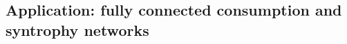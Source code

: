 \documentclass[12pt, titlepage]{report}
\begin{document}
%

\subsection{Application: fully connected consumption and syntrophy networks}

\end{document}

